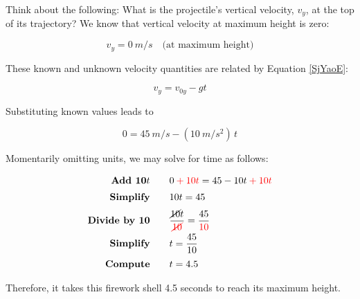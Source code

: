 \documentclass[main-physics.tex]{subfiles}
\begin{document}
Think about the following: What is the projectile's vertical velocity, $v_y$, at the top of its trajectory? We know that vertical velocity at maximum height is zero:

\begin{equation*}
    v_y = \SI{0}{m/s} \quad \text{(at maximum height)}
\end{equation*}

These known and unknown velocity quantities are related by Equation \eqref{SjYaoE}:

\begin{equation*}
    v_y = v_{0y} - gt
\end{equation*}

Substituting known values leads to 

\begin{equation*}
    0 = \SI{45}{m/s} - \left(\SI{10}{m/s^2}\right)\,t
\end{equation*}

Momentarily omitting units, we may solve for time as follows:

\begin{align*}
    \textbf{Add 10$t$} \qquad & 0 \mathbin{\color{red} +} \textcolor{red}{10 t} = 45 - 10t \mathbin{\color{red} +} \textcolor{red}{10 t}\\[0.5ex]
    \textbf{Simplify} \qquad & 10t = 45\\[0.5ex]
    \textbf{Divide by 10} \qquad & \frac{\cancel{10} t}{\textcolor{red}{\cancel{10}}} = \frac{45}{\textcolor{red}{10}}\\
    \textbf{Simplify} \qquad & t = \frac{45}{10}\\[0.5ex]
    \textbf{Compute} \qquad & t = 4.5
\end{align*}

Therefore, it takes this firework shell 4.5 seconds to reach its maximum height.

\endsolution








\end{document}
